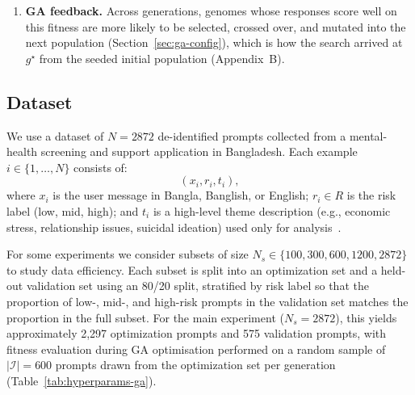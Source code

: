 \documentclass[mathematics,article,xetex,moreauthors]{Definitions/mdpi}
\begin{document}
\begin{enumerate}
        empathy soft penalty does apply. The per-example fitness
        (Eq.~\eqref{eq:per-example-fitness}) is
        \begin{align*}
          f_i(g^{\star}) &= \underbrace{0.40(0.45) + 0.40(1.00) + 0.15(1.00)}_{\text{base } A E_i+B S_i+C C_i}
            \;-\; \underbrace{0.18\,\tfrac{0.62-0.45}{0.62}}_{\text{empathy soft penalty}} \\
            &\quad + \underbrace{0.05(0.45) + 0.05(1.00) + 0.05\min(1.00,0.8)}_{\text{reinforcement terms}} \\
            &\approx 0.730 - 0.049 + 0.023 + 0.05 + 0.04 = 0.793.
        \end{align*}
        Averaging $f_i(g^{\star})$ over the $|\mathcal{I}|=600$ sampled
        prompts in a generation (Eq.~\eqref{eq:global}) gives the reported
        validation fitness $F(g^{\star}) \approx 0.677$
        (Table~\ref{tab:baseline-optimized}); the single-example value above
        is higher than this average, as expected for one example already
        matching the converged genome's dominant behaviour (full structure)
        while other sampled prompts and risk levels contribute lower
        per-example scores to the mean.
  \item \textbf{GA feedback.} Across generations, genomes whose responses
        score well on this fitness are more likely to be selected, crossed
        over, and mutated into the next population
        (Section~\ref{sec:ga-config}), which is how the search arrived at
        $g^{\star}$ from the seeded initial population (Appendix~B).
\end{enumerate}

\subsection{Dataset}

We use a dataset of \(N = 2872\) de-identified prompts collected from a
mental-health screening and support application in Bangladesh. Each example
\(i \in \{1,\dots,N\}\) consists of:
\begin{equation}
  (x_i, r_i, t_i),
\end{equation}
where \(x_i\) is the user message in Bangla, Banglish, or English;
\(r_i \in R\) is the risk label (low, mid, high); and \(t_i\) is a high-level
theme description (e.g., economic stress, relationship issues, suicidal
ideation) used only for analysis~\cite{jmir2025_chatbots}.

For some experiments we consider subsets of size
\(N_s \in \{100, 300, 600, 1200, 2872\}\) to study data efficiency. Each subset
is split into an optimization set and a held-out validation set using an
80/20 split, stratified by risk label so that the proportion of low-, mid-,
and high-risk prompts in the validation set matches the proportion in the
full subset. For the main experiment ($N_s = 2872$), this yields
approximately 2,297 optimization prompts and 575 validation prompts, with
fitness evaluation during GA optimisation performed on a random sample of
$|\mathcal{I}| = 600$ prompts drawn from the optimization set per generation
(Table~\ref{tab:hyperparams-ga}).
\end{document}
